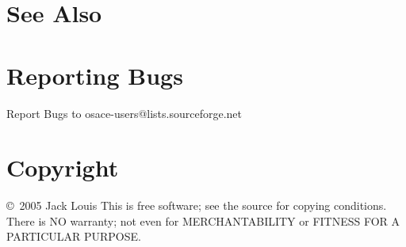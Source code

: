 \documentclass[english]{article}
\begin{document}
\section{See Also}
 

\section{Reporting Bugs}
\begin{description}
Report Bugs to osace-users@lists.sourceforge.net
\end{description}

\section{Copyright}
\begin{description}
\copyright\ 2005 Jack Louis 
This is free software; see the source for  copying  conditions.  There is NO warranty; not even for
MERCHANTABILITY or FITNESS FOR A PARTICULAR PURPOSE.
\end{description}

\LatexManEnd
\end{document}
